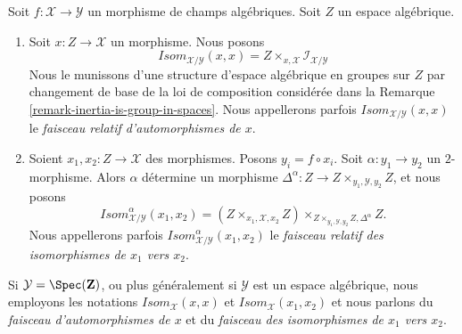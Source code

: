 \begin{definition}
\label{definition-isom}
Soit $f : \mathcal{X} \to \mathcal{Y}$ un morphisme de champs algébriques.
Soit $Z$ un espace algébrique.
\begin{enumerate}
\item Soit $x : Z \to \mathcal{X}$ un morphisme. Nous posons
$$
\mathit{Isom}_{\mathcal{X}/\mathcal{Y}}(x, x) =
Z \times_{x, \mathcal{X}} \mathcal{I}_{\mathcal{X}/\mathcal{Y}}
$$
Nous le munissons d'une structure d'espace algébrique en groupes sur $Z$ par
changement de base de la loi de composition considérée dans la Remarque
\ref{remark-inertia-is-group-in-spaces}. Nous appellerons parfois
$\mathit{Isom}_{\mathcal{X}/\mathcal{Y}}(x, x)$ le {\it faisceau relatif
d'automorphismes de $x$}.
\item Soient $x_1, x_2 : Z \to \mathcal{X}$ des morphismes. Posons
$y_i = f \circ x_i$. Soit $\alpha : y_1 \to y_2$ un $2$-morphisme.
Alors $\alpha$ détermine un morphisme
$\Delta^\alpha : Z \to Z \times_{y_1, \mathcal{Y}, y_2} Z$, et nous posons
$$
\mathit{Isom}_{\mathcal{X}/\mathcal{Y}}^\alpha(x_1, x_2) =
(Z \times_{x_1, \mathcal{X}, x_2} Z)
\times_{Z \times_{y_1, \mathcal{Y}, y_2} Z, \Delta^\alpha} Z.
$$
Nous appellerons parfois
$\mathit{Isom}_{\mathcal{X}/\mathcal{Y}}^\alpha(x_1, x_2)$
le {\it faisceau relatif des isomorphismes de $x_1$ vers $x_2$}.
\end{enumerate}
Si $\mathcal{Y} = \Spec(\mathbf{Z})$, ou plus généralement si
$\mathcal{Y}$ est un espace algébrique, nous employons les notations
$\mathit{Isom}_\mathcal{X}(x, x)$ et $\mathit{Isom}_\mathcal{X}(x_1, x_2)$
et nous parlons du {\it faisceau d'automorphismes de $x$} et du
{\it faisceau des isomorphismes de $x_1$ vers $x_2$}.
\end{definition}

